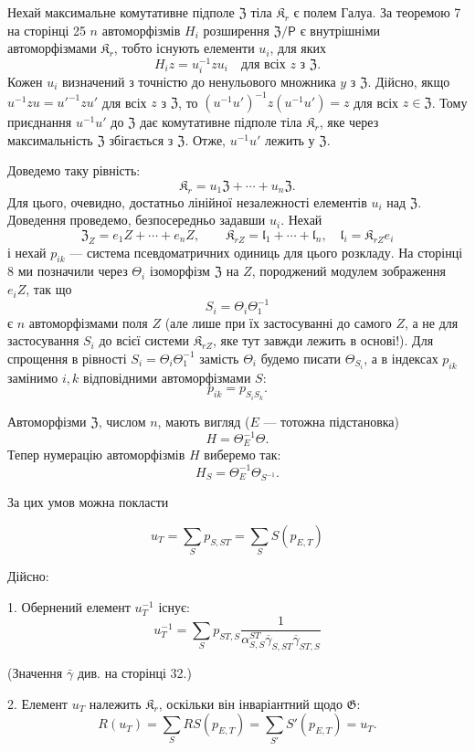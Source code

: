\documentclass[11pt]{article}
\begin{document}
Нехай максимальне комутативне підполе \(\mathfrak Z\) тіла \(\mathfrak K_r\) є полем Галуа. За теоремою 7 на сторінці 25 \(n\) автоморфізмів \(H_i\) розширення \(\mathfrak Z/\mathsf P\) є внутрішніми автоморфізмами \(\mathfrak K_r\), тобто існують елементи \(u_i\), для яких
\[
H_i z=u_i^{-1}zu_i\quad\text{для всіх }z\text{ з }\mathfrak Z.
\]
Кожен \(u_i\) визначений з точністю до ненульового множника \(y\) з \(\mathfrak Z\). Дійсно, якщо \(u^{-1}zu=u'^{-1}zu'\) для всіх \(z\) з \(\mathfrak Z\), то \((u^{-1}u')^{-1}z(u^{-1}u')=z\) для всіх \(z\in\mathfrak Z\). Тому приєднання \(u^{-1}u'\) до \(\mathfrak Z\) дає комутативне підполе тіла \(\mathfrak K_r\), яке через максимальність \(\mathfrak Z\) збігається з \(\mathfrak Z\). Отже, \(u^{-1}u'\) лежить у \(\mathfrak Z\).

Доведемо таку рівність:
\[
\mathfrak K_r=u_1\mathfrak Z+\cdots+u_n\mathfrak Z.
\]
Для цього, очевидно, достатньо лінійної незалежності елементів \(u_i\) над \(\mathfrak Z\). Доведення проведемо, безпосередньо задавши \(u_i\). Нехай
\[
\mathfrak Z_Z=e_1Z+\cdots+e_nZ,\qquad
\mathfrak K_{rZ}=\mathfrak l_1+\cdots+\mathfrak l_n,\quad
\mathfrak l_i=\mathfrak K_{rZ}e_i
\]
і нехай \(p_{ik}\) --- система псевдоматричних одиниць для цього розкладу. На сторінці 8 ми позначили через \(\Theta_i\) ізоморфізм \(\mathfrak Z\) на \(Z\), породжений модулем зображення \(e_iZ\), так що
\[
S_i=\Theta_i\Theta_1^{-1}
\]
є \(n\) автоморфізмами поля \(Z\) (але лише при їх застосуванні до самого \(Z\), а не для застосування \(S_i\) до всієї системи \(\mathfrak K_{rZ}\), яке тут завжди лежить в основі!). Для спрощення в рівності \(S_i=\Theta_i\Theta_1^{-1}\) замість \(\Theta_i\) будемо писати \(\Theta_{S_i}\), а в індексах \(p_{ik}\) замінимо \(i,k\) відповідними автоморфізмами \(S\):
\[
p_{ik}=p_{S_iS_k}.
\]

Автоморфізми \(\mathfrak Z\), числом \(n\), мають вигляд (\(E\) --- тотожна підстановка)
\[
H=\Theta_E^{-1}\Theta.
\]
Тепер нумерацію автоморфізмів \(H\) виберемо так:
\[
H_S=\Theta_E^{-1}\Theta_{S^{-1}}.
\]

За цих умов можна покласти

\[
u_T=\sum_S p_{S,ST}=\sum_S S(p_{E,T})
\]

Дійсно:

1. Обернений елемент \(u_T^{-1}\) існує:
\[
u_T^{-1}=\sum_S p_{ST,S}
\frac{1}{\alpha_{S,S}^{ST}\overline{\gamma}_{S,ST}\overline{\gamma}_{ST,S}}
\]

(Значення \(\bar{\gamma}\) див. на сторінці 32.)

2. Елемент \(u_T\) належить \(\mathfrak K_r\), оскільки він інваріантний щодо \(\mathfrak G\):
\[
R(u_T)=\sum_S RS(p_{E,T})=\sum_{S'} S'(p_{E,T})=u_T.
\]
\end{document}
